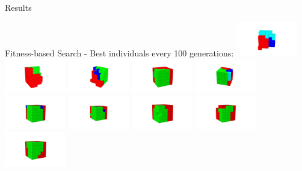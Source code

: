 \documentclass{beamer}
\begin{document}
\begin{frame}[allowframebreaks]{Results}
\begin{minipage}{\textwidth}
\begin{block}{Fitness-based Search - Best individuals every 100 generations:}
\includegraphics[width=0.2\textwidth]{figures/Robots/f_3_g_100.jpg}
\includegraphics[width=0.2\textwidth]{figures/Robots/f_3_g_200.jpg}
\includegraphics[width=0.2\textwidth]{figures/Robots/f_3_g_300.jpg}
\includegraphics[width=0.2\textwidth]{figures/Robots/f_3_g_400.jpg}
\includegraphics[width=0.2\textwidth]{figures/Robots/f_3_g_500.jpg}\\
\includegraphics[width=0.2\textwidth]{figures/Robots/f_3_g_600.jpg}
\includegraphics[width=0.2\textwidth]{figures/Robots/f_3_g_700.jpg}
\includegraphics[width=0.2\textwidth]{figures/Robots/f_3_g_800.jpg}
\includegraphics[width=0.2\textwidth]{figures/Robots/f_3_g_900.jpg}
\includegraphics[width=0.2\textwidth]{figures/Robots/f_3_g_1000.jpg}
\end{block}
\end{minipage}


\end{frame}
\end{document}
